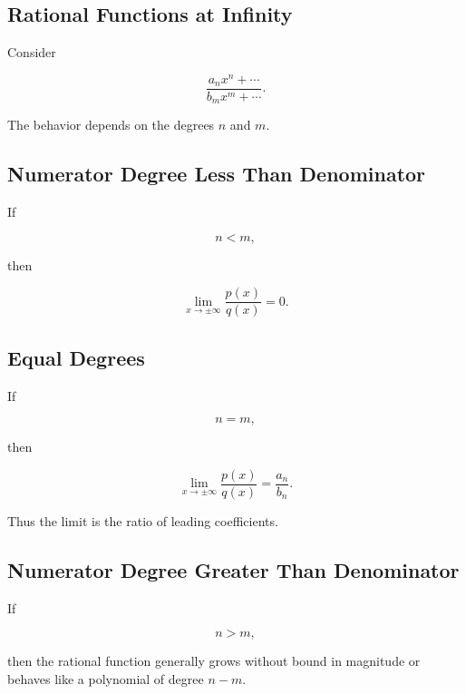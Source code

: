 \subsection{Rational Functions at Infinity}
\label{subsec:rational-functions-infinity}

Consider

\[
\frac{
a_nx^n+\cdots
}{
b_mx^m+\cdots
}.
\]

The behavior depends on the degrees \(n\) and \(m\).

\subsection{Numerator Degree Less Than Denominator}
\label{subsec:rational-degree-less}

If

\[
n<m,
\]

then

\[
\boxed{
\lim_{x\to\pm\infty}
\frac{p(x)}{q(x)}
=
0.
}
\]

\subsection{Equal Degrees}
\label{subsec:rational-equal-degree}

If

\[
n=m,
\]

then

\[
\boxed{
\lim_{x\to\pm\infty}
\frac{p(x)}{q(x)}
=
\frac{a_n}{b_n}.
}
\]

Thus the limit is the ratio of leading coefficients.

\subsection{Numerator Degree Greater Than Denominator}
\label{subsec:rational-degree-greater}

If

\[
n>m,
\]

then the rational function generally grows without bound in magnitude or
behaves like a polynomial of degree \(n-m\).

